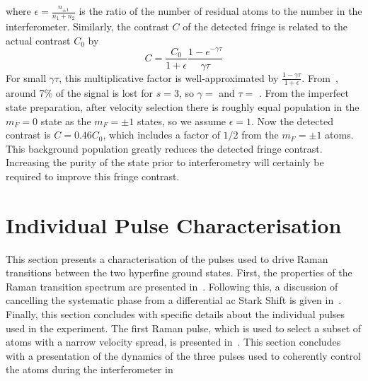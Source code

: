 where \(\epsilon = \frac{n_{\pm{1}}}{n_1+n_2}\) is the ratio of the
number of residual atoms to the number in the interferometer.
Similarly, the contrast $C$ of the detected fringe is related to the
actual contrast $C_0$ by 
\begin{equation}
  C = \frac{C_0}{1+\epsilon}\frac{1-e^{-\gamma \tau}}{\gamma \tau}
  \label{eq:contrast}
\end{equation}
For small $\gamma \tau$, this multiplicative factor is
well-approximated by $\frac{1-\gamma \tau}{1+\epsilon}$. 
From~, around 7\% of the signal is lost
for \(s = 3\), so $\gamma = $  and $\tau =$
. From the imperfect state preparation, after
velocity selection there is roughly equal population in the $m_F = 0$
state as the $m_F = \pm 1$ states, so we assume $\epsilon = 1$. 
Now the detected contrast is $C = 0.46 C_0$, which includes a factor
of $1/2$ from the $m_F = \pm 1$ atoms. This background population
greatly reduces the detected fringe contrast. Increasing the purity of
the state prior to interferometry will certainly be required to
improve this fringe contrast. 
\section{Individual Pulse Characterisation} \label{sec:atomint_rabiosc}
This section presents a characterisation of the pulses used to drive
Raman transitions between the two hyperfine ground states. First, the
properties of the Raman transition spectrum are presented
in~. Following this, a discussion of
cancelling the systematic phase from a differential ac Stark Shift is
given in~. Finally, this section
concludes with specific details about the individual pulses used in
the experiment. The first Raman pulse, which is used to select a
subset of atoms with a narrow velocity spread, is presented
in~. This section concludes with a presentation
of the dynamics of the three pulses used to coherently control the
atoms during the interferometer in~
